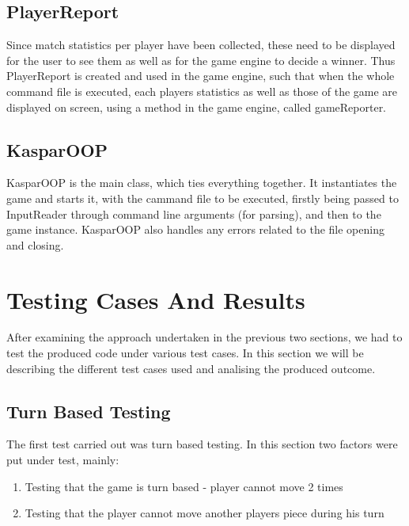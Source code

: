\documentclass[12pt, A4]{report}
\begin{document}
		\subsection*{PlayerReport}
		Since match statistics per player have been collected, these need to be displayed for the user to see them as well as for the game engine to decide a winner. Thus PlayerReport is created and used in the game engine, such that when the whole command file is executed, each players statistics as well as those of the game are displayed on screen, using a method in the game engine, called gameReporter.

		\subsection*{KasparOOP}
		KasparOOP is the main class, which ties everything together. It instantiates the game and starts it, with the cammand file to be executed, firstly being passed to  InputReader through command line arguments (for parsing), and then to the game instance. KasparOOP also handles any errors related to the file opening and closing.
	 
	\section*{Testing Cases And Results}
	After examining the approach undertaken in the previous two sections, we had to test the produced code under various test cases. In this section we will be describing the different test cases used and analising the produced outcome. 

		\subsection*{Turn Based Testing}
		The first test carried out was turn based testing. In this section two factors were put under test, mainly:
			\begin{enumerate}
				\item Testing that the game is turn based - player cannot move 2 times
				\item Testing that the player cannot move another players piece during his turn
			\end{enumerate}

			\begin{figure}[h]
				\centering	
				\qquad
			\end{figure}
\end{document}
